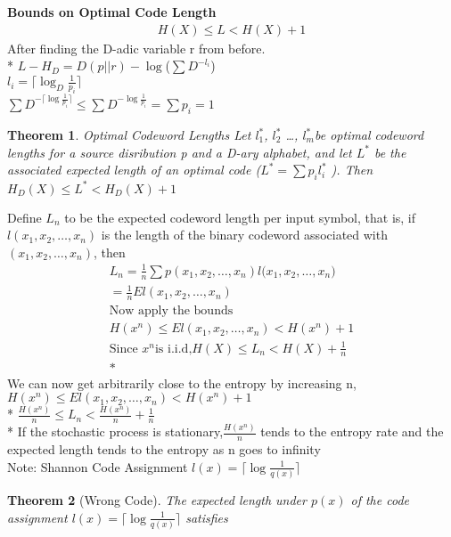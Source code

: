 \documentclass[10pt]{article}
\newtheorem{thm}{Theorem}[section]
\begin{document}
\begin{tiny}
\begin{multicols}{3}
\textbf{\scriptsize Bounds on Optimal Code Length}
\begin{eqnarray*}
H(X) \leq L < H(X) + 1
\end{eqnarray*}
After finding the D-adic variable r from before. \\*
$L-H_D = D(p||r) - \log $($\sum D^{-l_i}$) \\
${l_i} = \lceil{\log_D \frac {1}{p_i}} \rceil$ \\
$\sum D^{- \lceil \log \frac {1}{p_i}\rceil}\leq\sum D^{- \log\frac{1}{p_i}}=\sum {p_i}=1$ 
\begin{thm}{Optimal Codeword Lengths} \label{thm:optimum codewords}
Let ${l_1^{*}}$, ${l_2^{*}}$ \ldots , ${l_m^{*}}$be optimal codeword lengths for a
source disribution p and a D-ary alphabet, and let ${L^{*}}$ be the associated
expected length of an optimal code (${L^{*}}=\sum{p_i}{l_i^{*}}$ ). Then
${H_D(X)}\leq L^{*}<{H_D(X)}+1$ 
\end{thm}
Define ${L_n}$ to be the expected codeword length per input symbol, that is,
if ${l(x_1,x_2, \ldots ,x_n)}$ is the length of the binary codeword associated with
${(x_1,x_2, \ldots ,x_n)}$, then \newline
\begin{eqnarray*}
{L_n} = \frac {1}{n}\sum{p(x_1,x_2, \ldots ,x_n)}{l(x_1,x_2, \ldots ,x_n})\\
= \frac{1}{n}El(x_1,x_2, \ldots ,x_n)\\
\text{Now apply the bounds}\\
{H(x^{n})} \leq El(x_1,x_2, \ldots ,x_n) < {H(x^{n})} + 1 \\
\text{Since } {x^{n}} \text{is i.i.d,} {H(X)} \leq {L_n} < {H(X)} + \frac{1}{n} \\*
\end{eqnarray*}
We can now get arbitrarily close to the entropy by increasing n, \newline
${H(x^{n})} \leq El(x_1,x_2, \ldots ,x_n) < {H(x^{n})} + 1$ \\*
$\frac{H(x^{n})}{n}\leq {L_n}<\frac{H(x^{n})}{n}+\frac{1}{n}$ \\*
If the stochastic process is stationary,$\frac{H(x^{n})}{n}$ tends to the entropy rate \newline
and the expected length tends to the entropy as n goes to infinity \\
Note: Shannon Code Assignment $l(x) = \lceil \log \frac {1}{q(x)} \rceil$
\begin{thm}[Wrong Code] \label{thm:wrongcode}
The expected length under ${p(x)}$ of the code assignment ${l(x)}=\lceil\log\frac{1}{q(x)}\rceil$ satisfies 

\end{thm}
\end{multicols}
\end{tiny}
\end{document}

